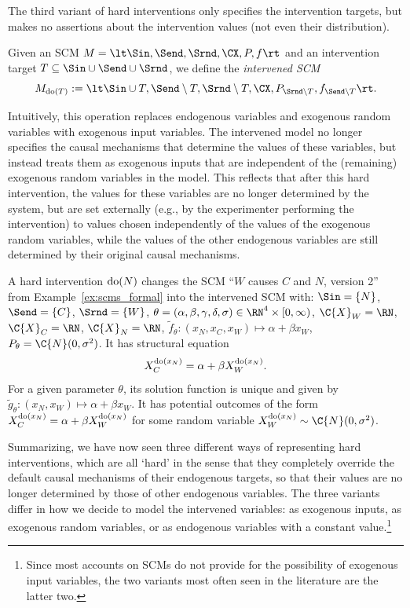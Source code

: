 The third variant of hard interventions only specifies the intervention targets, but makes
no assertions about the intervention values (not even their distribution).
\begin{Def}\label{def:scm_hard_intervention_unspecified}
  Given an SCM $M = \lt \Sin, \Send, \Srnd, \CX, P, f \rt$
  and an intervention target $T \subseteq \Sin \cup \Send \cup \Srnd$, we define the \emph{intervened SCM}
  $$M_{\doit(T)} := \lt \Sin \cup T,\Send \setminus T,\Srnd \setminus T,\CX,P_{\Srnd\setminus T},f_{\Send\setminus T} \rt.$$
\end{Def}
Intuitively, this operation replaces endogenous variables and exogenous random variables with exogenous input variables.
The intervened model no longer specifies the causal mechanisms that determine the values of these variables, 
but instead treats them as exogenous inputs that are independent of the (remaining) exogenous random variables in the model. 
This reflects that after this hard intervention, the values for
these variables are no longer determined by the system, but are set externally (e.g., by the 
experimenter performing the intervention) to values chosen independently of the values of the exogenous
random variables, while the values of the other endogenous variables are still
determined by their original causal mechanisms.
\begin{Eg}
  A hard intervention $\operatorname{do}(N)$ changes the SCM ``$W$ causes $C$ and $N$, version 2'' from Example~\ref{ex:scms_formal} 
  into the intervened SCM with:
  $\Sin = \{N\}$, $\Send = \{C\}$, $\Srnd = \{W\}$, $\theta = (\alpha,\beta,\gamma,\delta,\sigma) \in \RN^4 \times [0,\infty)$, 
  $\C{X}_W = \RN$, $\C{X}_C = \RN$, $\C{X}_N = \RN$, $\tilde{f}_\theta : (x_N, x_C, x_W) \mapsto \alpha + \beta x_W$, $P_\theta = \C{N}(0,\sigma^2)$.
  It has structural equation
  $$X_C^{\operatorname{do}(x_N)} = \alpha + \beta X_W^{\operatorname{do}(x_N)}.$$
  For a given parameter $\theta$, its solution function is unique and given by $\tilde{g}_\theta : (x_N, x_W) \mapsto \alpha + \beta x_W$. 
  It has potential outcomes of the form $X_C^{\operatorname{do}(x_N)} = \alpha + \beta X^{\operatorname{do}(x_N)}_W$ for some random variable $X_W^{\doit(x_N)} \sim \C{N}(0,\sigma^2)$. 
\end{Eg}

Summarizing, we have now seen three different ways of representing hard interventions, which are all `hard' in the sense that they completely override the default causal mechanisms of their endogenous targets, so that their values are no longer determined by those of other endogenous variables. 
The three variants differ in how we decide to model the intervened variables: as exogenous inputs, as exogenous random variables, or as endogenous variables with a constant value.\footnote{Since most accounts on SCMs do not provide for the possibility of exogenous input variables, the two variants most often seen in the literature are the latter two.}

